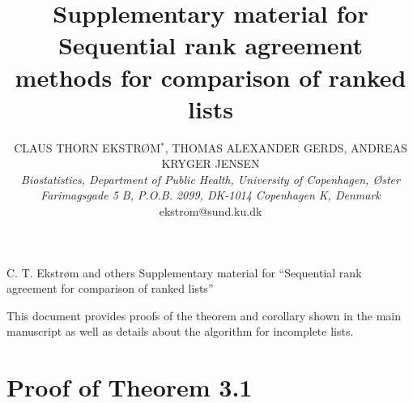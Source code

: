 \documentclass[oupdraft]{bio}
\begin{document}
\title{Supplementary material for Sequential rank agreement methods for comparison of ranked lists}

\author{CLAUS THORN EKSTRØM$^\ast$, THOMAS ALEXANDER GERDS, ANDREAS KRYGER JENSEN\\[4pt]
%
\textit{%
Biostatistics, Department of Public Health,
University of Copenhagen,
Øster Farimagsgade 5 B, P.O.B. 2099,
DK-1014 Copenhagen K, Denmark}
\\[2pt]
{ekstrom@sund.ku.dk}}





\markboth%
{C. T. Ekstrøm and others}
{Supplementary material for ``Sequential rank agreement for comparison of ranked lists''}

\maketitle


This document provides proofs of the theorem and corollary shown in the main manuscript as well as details about the algorithm for incomplete lists.

\appendix

\section{Proof of Theorem 3.1}
\label{sec:appA}
\end{document}
